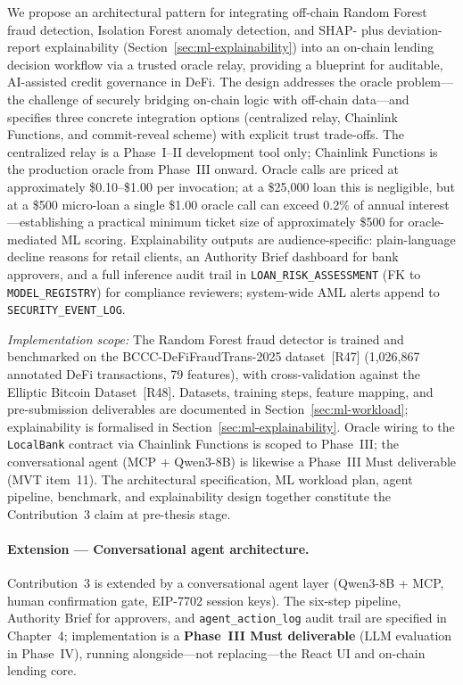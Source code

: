 \documentclass[12pt,a4paper]{report}
\begin{document}
\begin{description}[leftmargin=0pt]
\item[\textbf{Contribution 3 --- Oracle-Mediated AI/ML Integration with Explainability.}]
We propose an architectural pattern for integrating off-chain Random Forest fraud detection, Isolation Forest anomaly detection, and SHAP- plus deviation-report explainability (Section~\ref{sec:ml-explainability}) into an on-chain lending decision workflow via a trusted oracle relay, providing a blueprint for auditable, AI-assisted credit governance in DeFi. The design addresses the oracle problem---the challenge of securely bridging on-chain logic with off-chain data---and specifies three concrete integration options (centralized relay, Chainlink Functions, and commit-reveal scheme) with explicit trust trade-offs. The centralized relay is a Phase~I--II development tool only; Chainlink Functions is the production oracle from Phase~III onward. Oracle calls are priced at approximately \$0.10--\$1.00 per invocation; at a \$25{,}000 loan this is negligible, but at a \$500 micro-loan a single \$1.00 oracle call can exceed 0.2\% of annual interest---establishing a practical minimum ticket size of approximately \$500 for oracle-mediated ML scoring. Explainability outputs are audience-specific: plain-language decline reasons for retail clients, an Authority Brief dashboard for bank approvers, and a full inference audit trail in \texttt{LOAN\_RISK\_ASSESSMENT} (FK to \texttt{MODEL\_REGISTRY}) for compliance reviewers; system-wide AML alerts append to \texttt{SECURITY\_EVENT\_LOG}.

\textit{Implementation scope:} The Random Forest fraud detector is trained and benchmarked on the BCCC-DeFiFraudTrans-2025 dataset~[R47] (1,026,867 annotated DeFi transactions, 79 features), with cross-validation against the Elliptic Bitcoin Dataset~[R48]. Datasets, training steps, feature mapping, and pre-submission deliverables are documented in Section~\ref{sec:ml-workload}; explainability is formalised in Section~\ref{sec:ml-explainability}. Oracle wiring to the \texttt{LocalBank} contract via Chainlink Functions is scoped to Phase~III; the conversational agent (MCP + Qwen3-8B) is likewise a Phase~III Must deliverable (MVT item~11). The architectural specification, ML workload plan, agent pipeline, benchmark, and explainability design together constitute the Contribution~3 claim at pre-thesis stage.

\paragraph{Extension --- Conversational agent architecture.}
Contribution~3 is extended by a conversational agent layer (Qwen3-8B + MCP, human confirmation gate, EIP-7702 session keys). The six-step pipeline, Authority Brief for approvers, and \texttt{agent\_action\_log} audit trail are specified in Chapter~4; implementation is a \textbf{Phase~III Must deliverable} (LLM evaluation in Phase~IV), running alongside---not replacing---the React UI and on-chain lending core.


\end{description}
\end{document}
